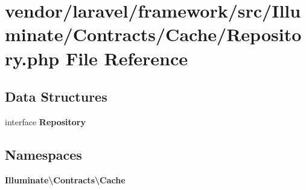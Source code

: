 \section{vendor/laravel/framework/src/\+Illuminate/\+Contracts/\+Cache/\+Repository.php File Reference}
\label{_contracts_2_cache_2_repository_8php}
\subsection*{Data Structures}
\begin{DoxyCompactItemize}
\item 
interface {\bf Repository}
\end{DoxyCompactItemize}
\subsection*{Namespaces}
\begin{DoxyCompactItemize}
\item 
 {\bf Illuminate\textbackslash{}\+Contracts\textbackslash{}\+Cache}
\end{DoxyCompactItemize}

